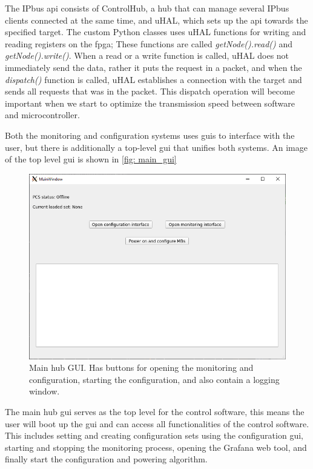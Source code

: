 \documentclass[main.tex]{subfiles}
\begin{document}
The IPbus \gls{api} consists of ControlHub, a hub that can manage several IPbus clients connected at the same time, and uHAL, which sets up the \gls{api} towards the specified target. The custom Python classes uses uHAL functions for writing and reading registers on the \gls{fpga}; These functions are called \textit{getNode().read()} and \textit{getNode().write()}. When a read or a write function is called, uHAL does not immediately send the data, rather it puts the request in a packet, and when the \textit{dispatch()} function is called, uHAL establishes a connection with the target and sends all requests that was in the packet. This dispatch operation will become important when we start to optimize the transmission speed between software and microcontroller.

Both the monitoring and configuration systems uses \gls{gui}s to interface with the user, but there is additionally a top-level \gls{gui} that unifies both systems. An image of the top level \gls{gui} is shown in \autoref{fig: main_gui}

\begin{figure}[!htpb]
    \centering
    \includegraphics[scale=0.65]{images/main_gui.png}
    \caption{Main hub GUI. Has buttons for opening the monitoring and configuration, starting the configuration, and also contain a logging window.}
    \label{fig: main_gui}
\end{figure}
\FloatBarrier 

The main hub \gls{gui} serves as the top level for the control software, this means the user will boot up the \gls{gui} and can access all functionalities of the control software. This includes setting and creating configuration sets using the configuration \gls{gui}, starting and stopping the monitoring process, opening the Grafana web tool, and finally start the configuration and powering algorithm.
\end{document}
